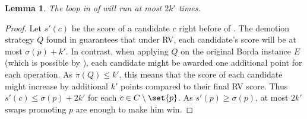 \documentclass[letterpaper]{article} %
\newtheorem{lemma}{Lemma}
\begin{document}
\begin{lemma} \label{2t-loopLemma}
The loop in  of  will run at most $2k'$ times.
\end{lemma}
\begin{proof}
Let $s'(c)$ be the score of a candidate $c$ right before  of .
The demotion strategy $Q$  found in  guarantees that under RV, each candidate's score will be at most $\sigma(p)+k'$. In contrast, when applying $Q$ on the original Borda instance $E$ (which is possible by ), each candidate might be awarded one additional point for each operation. As $\pi(Q) \leq k'$, this means that the score of each candidate might increase by additional $k'$ points compared to their final RV score. Thus $s'(c) \leq \sigma(p) + 2k'$ for each $c \in C \setminus \set{p}$.
As $s'(p) \geq \sigma(p)$, at most $2k'$ swaps promoting $p$ are enough to make him win. 
\end{proof}
\end{document}

